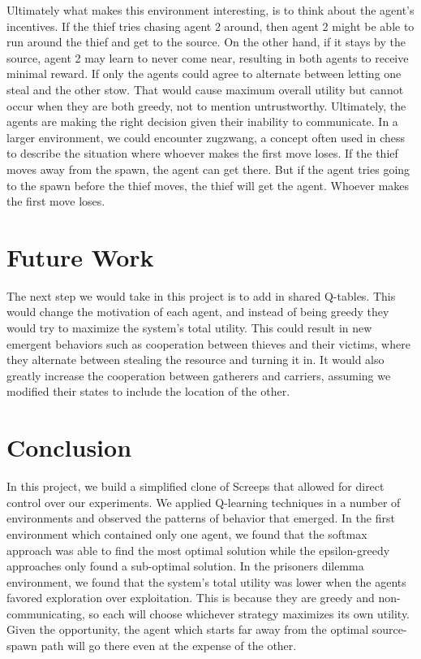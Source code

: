 \documentclass[11pt]{article}
\begin{document}
Ultimately what makes this environment interesting, is to think about the agent's incentives. If the thief tries chasing agent 2 around, then agent 2 might be able to run around the thief and get to the source. On the other hand, if it stays by the source, agent 2 may learn to never come near, resulting in both agents to receive minimal reward. If only the agents could agree to alternate between letting one steal and the other stow. That would cause maximum overall utility but cannot occur when they are both greedy, not to mention untrustworthy. Ultimately, the agents are making the right decision given their inability to communicate. In a larger environment, we could encounter zugzwang, a concept often used in chess to describe the situation where whoever makes the first move loses. If the thief moves away from the spawn, the agent can get there. But if the agent tries going to the spawn before the thief moves, the thief will get the agent. Whoever makes the first move loses.

\section{Future Work}

The next step we would take in this project is to add in shared Q-tables. This would change the motivation of each agent, and instead of being greedy they would try to maximize the system's total utility. This could result in new emergent behaviors such as cooperation between thieves and their victims, where they alternate between stealing the resource and turning it in. It would also greatly increase the cooperation between gatherers and carriers, assuming we modified their states to include the location of the other.

\section{Conclusion}

	In this project, we build a simplified clone of Screeps that allowed for direct control over our experiments. We applied Q-learning techniques in a number of environments and observed the patterns of behavior that emerged. In the first environment which contained only one agent, we found that the softmax approach was able to find the most optimal solution while the epsilon-greedy approaches only found a sub-optimal solution. In the prisoners dilemma environment, we found that the system's total utility was lower when the agents favored exploration over exploitation. This is because they are greedy and non-communicating, so each will choose whichever strategy maximizes its own utility. Given the opportunity, the agent which starts far away from the optimal source-spawn path will go there even at the expense of the other. 
	
\end{document}
